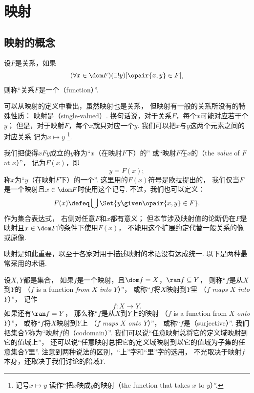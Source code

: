 \section{映射}
\subsection{映射的概念}
\begin{definition}
设\(F\)是关系，如果\begin{equation*}
	(\forall x \in \dom F)(\exists! y)[\opair{x,y} \in F],
\end{equation*}
则称“关系\(F\)是一个（function）”.
\end{definition}
可以从映射的定义中看出，虽然映射也是关系，
但映射有一般的关系所没有的特殊性质：
映射是（single-valued）.
换句话说，对于关系\(F\)，每个\(x\)可能对应若干个\(y\)；
但是，对于映射\(F\)，每个\(x\)就只对应一个\(y\).
我们可以把\(x\)与\(y\)这两个元素之间的对应关系
记为\(x \mapsto y\) \footnote{
	记号\(x \mapsto y\)
	读作“把\(x\)映成\(y\)的映射（the function that takes \(x\) to \(y\)）”.
}.

我们把使得\(xFy\)成立的\(y\)称为“\(x\)（在映射\(F\)下）的”
或“映射\(F\)在\(x\)的（the \emph{value} of \(F\) at \(x\)）”，
记为\(F(x)\)，即\begin{equation*}
	y = F(x);
\end{equation*}
称\(x\)为“\(y\)（在映射\(F\)下）的一个”.
这里用的\(F(x)\)符号是欧拉提出的，
我们仅当\(F\)是一个映射且\(x\in\dom F\)时使用这个记号.
不过，我们也可以定义：\begin{equation*}
	F(x) \defeq \bigcup\Set{ y \given \opair{x,y} \in F }.
\end{equation*}
作为集合表达式，
右侧对任意\(F\)和\(x\)都有意义；
但本节涉及映射值的论断仍在\(F\)是映射且\(x\in\dom F\)的条件下使用\(F(x)\)，
不能用这个扩展约定代替一般关系的像或原像.

映射是如此重要，以至于各家对用于描述映射的术语没有达成统一.
以下是两种最常采用的术语.

设\(X,Y\)都是集合，
如果\(f\)是一个映射，且\(\dom f = X\)，\(\ran f \subseteq Y\)，
则称“\(f\)是从\(X\)到\(Y\)的%
（\(f\) is a function \emph{from} \(X\) \emph{into} \(Y\)）”，
或称“\(f\)将\(X\)映射到\(Y\)里%
（\(f\) \emph{maps} \(X\) \emph{into} \(Y\)）”，
记作\begin{equation*}
	f\colon X \to Y.
\end{equation*}
如果还有\(\ran f = Y\)，
那么称“\(f\)是从\(X\)到\(Y\)上的映射%
（\(f\) is a function from \(X\) \emph{onto} \(Y\)）”，
或称“\(f\)将\(X\)映射到\(Y\)上%
（\(f\) \emph{maps} \(X\) \emph{onto} \(Y\)）”，
或称“\(f\)是（surjective）”.
我们把集合\(Y\)称为“映射\(f\)的（codomain）”.
我们可以说“任意映射总将它的定义域映射到它的值域上”，
还可以说“任意映射总把它的定义域映射到以它的值域为子集的任意集合\(Y\)里”.
注意到两种说法的区别，“上”字和“里”字的选用，
不光取决于映射\(f\)本身，还取决于我们讨论的陪域\(Y\).

